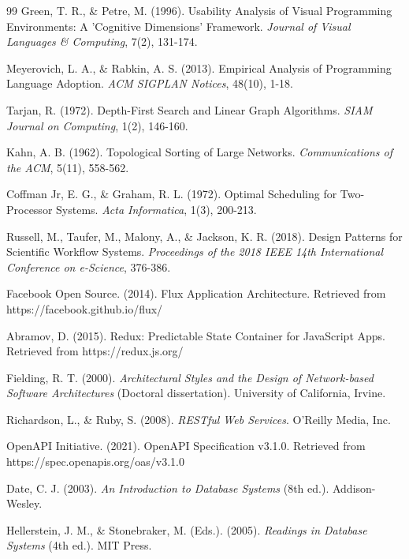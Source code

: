 \documentclass[12pt]{article}
\begin{document}
\begin{thebibliography}{99}
Green, T. R., \& Petre, M. (1996). Usability Analysis of Visual Programming Environments: A 'Cognitive Dimensions' Framework. \textit{Journal of Visual Languages \& Computing}, 7(2), 131-174.

Meyerovich, L. A., \& Rabkin, A. S. (2013). Empirical Analysis of Programming Language Adoption. \textit{ACM SIGPLAN Notices}, 48(10), 1-18.

Tarjan, R. (1972). Depth-First Search and Linear Graph Algorithms. \textit{SIAM Journal on Computing}, 1(2), 146-160.

Kahn, A. B. (1962). Topological Sorting of Large Networks. \textit{Communications of the ACM}, 5(11), 558-562.

Coffman Jr, E. G., \& Graham, R. L. (1972). Optimal Scheduling for Two-Processor Systems. \textit{Acta Informatica}, 1(3), 200-213.

Russell, M., Taufer, M., Malony, A., \& Jackson, K. R. (2018). Design Patterns for Scientific Workflow Systems. \textit{Proceedings of the 2018 IEEE 14th International Conference on e-Science}, 376-386.

Facebook Open Source. (2014). Flux Application Architecture. Retrieved from https://facebook.github.io/flux/

Abramov, D. (2015). Redux: Predictable State Container for JavaScript Apps. Retrieved from https://redux.js.org/

Fielding, R. T. (2000). \textit{Architectural Styles and the Design of Network-based Software Architectures} (Doctoral dissertation). University of California, Irvine.

Richardson, L., \& Ruby, S. (2008). \textit{RESTful Web Services}. O'Reilly Media, Inc.

OpenAPI Initiative. (2021). OpenAPI Specification v3.1.0. Retrieved from https://spec.openapis.org/oas/v3.1.0

Date, C. J. (2003). \textit{An Introduction to Database Systems} (8th ed.). Addison-Wesley.

Hellerstein, J. M., \& Stonebraker, M. (Eds.). (2005). \textit{Readings in Database Systems} (4th ed.). MIT Press.

\end{thebibliography}
\end{document}
